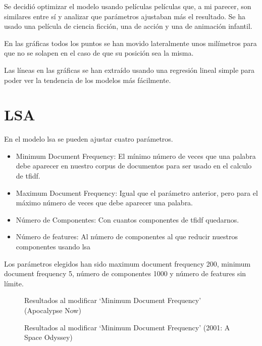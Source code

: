 \documentclass[withindex, glossary]{cam-thesis}
\begin{document}
Se decidió optimizar el modelo usando películas películas que, a mi parecer, son similares entre sí y analizar que parámetros ajustaban más el resultado. Se ha usado una película de ciencia ficción, una de acción y una de animación infantil.

En las gráficas todos los puntos se han movido lateralmente unos milímetros para que no se solapen en el caso de que su posición sea la misma.

Las líneas en las gráficas se han extraído usando una regresión lineal simple para poder ver la tendencia de los modelos más fácilmente.

\section{LSA}
En el modelo \acrshort{lsa} se pueden ajustar cuatro parámetros.

\begin{itemize}
    \item Minimum Document Frequency: El mínimo número de veces que una palabra debe aparecer en nuestro corpus de documentos para ser usado en el calculo de \acrshort{tfidf}.
    \item Maximum Document Frequency: Igual que el parámetro anterior, pero para el máximo número de veces que debe aparecer una palabra.
    \item Número de Componentes: Con cuantos componentes de \acrshort{tfidf} quedarnos.
    \item Número de features: Al número de componentes al que reducir nuestros componentes usando \acrshort{lsa}
\end{itemize}

Los parámetros elegidos han sido maximum document frequency 200, minimum document frequency 5, número de componentes 1000 y número de features sin límite.

\newlength\figureheight
\newlength\figurewidth
\setlength{}
\setlength\figurewidth{\linewidth}
\begin{figure}[!htbp]
    \centering
    
    \caption{Resultados al modificar `Minimum Document Frequency' (Apocalypse Now)}
\end{figure}

\begin{figure}[!htbp]
    \centering
    
    \caption{Resultados al modificar `Minimum Document Frequency' (2001: A Space Odyssey)}
\end{figure}
\end{document}
